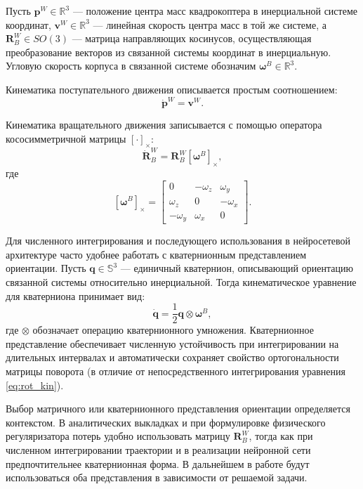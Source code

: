 Пусть \(\mathbf{p}^W \in \mathbb{R}^3\) — положение центра масс квадрокоптера в инерциальной системе координат, \(\mathbf{v}^W \in \mathbb{R}^3\) — линейная скорость центра масс в той же системе, а \(\mathbf{R}^W_B \in SO(3)\) — матрица направляющих косинусов, осуществляющая преобразование векторов из связанной системы координат в инерциальную. Угловую скорость корпуса в связанной системе обозначим \(\boldsymbol{\omega}^B \in \mathbb{R}^3\).

Кинематика поступательного движения описывается простым соотношением:
\begin{equation}
	\dot{\mathbf{p}}^W = \mathbf{v}^W.
	\label{eq:pos_kin}
\end{equation}

Кинематика вращательного движения записывается с помощью оператора кососимметричной матрицы \([\cdot]_\times\):
\begin{equation}
	\dot{\mathbf{R}}^W_B = \mathbf{R}^W_B [\boldsymbol{\omega}^B]_\times,
	\label{eq:rot_kin}
\end{equation}
где
\[
[\boldsymbol{\omega}^B]_\times = 
\begin{bmatrix}
	0 & -\omega_z & \omega_y \\
	\omega_z & 0 & -\omega_x \\
	-\omega_y & \omega_x & 0
\end{bmatrix}.
\]

Для численного интегрирования и последующего использования в нейросетевой архитектуре часто удобнее работать с кватернионным представлением ориентации. Пусть \(\mathbf{q} \in \mathbb{S}^3\) — единичный кватернион, описывающий ориентацию связанной системы относительно инерциальной. Тогда кинематическое уравнение для кватерниона принимает вид:
\begin{equation}
	\dot{\mathbf{q}} = \frac{1}{2} \mathbf{q} \otimes \boldsymbol{\omega}^B,
	\label{eq:quat_kin}
\end{equation}
где \(\otimes\) обозначает операцию кватернионного умножения. Кватернионное представление обеспечивает численную устойчивость при интегрировании на длительных интервалах и автоматически сохраняет свойство ортогональности матрицы поворота (в отличие от непосредственного интегрирования уравнения \eqref{eq:rot_kin}).

Выбор матричного или кватернионного представления ориентации определяется контекстом. В аналитических выкладках и при формулировке физического регуляризатора потерь удобно использовать матрицу \(\mathbf{R}^W_B\), тогда как при численном интегрировании траектории и в реализации нейронной сети предпочтительнее кватернионная форма. В дальнейшем в работе будут использоваться оба представления в зависимости от решаемой задачи.

